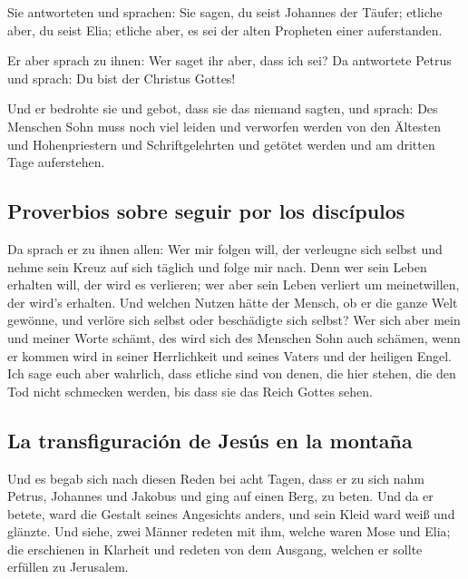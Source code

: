  Sie antworteten und sprachen: Sie sagen, du seist
Johannes der Täufer; etliche aber, du seist Elia; etliche aber, es sei
der alten Propheten einer auferstanden.

 Er aber sprach zu ihnen: Wer saget ihr aber, dass ich
sei? Da antwortete Petrus und sprach: Du bist der Christus Gottes!

 Und er bedrohte sie und gebot, dass sie das niemand
sagten,  und sprach: Des Menschen Sohn muss noch viel
leiden und verworfen werden von den Ältesten und Hohenpriestern und
Schriftgelehrten und getötet werden und am dritten Tage auferstehen.

\hypertarget{proverbios-sobre-seguir-por-los-discuxedpulos}{%
\subsection{Proverbios sobre seguir por los
discípulos}\label{proverbios-sobre-seguir-por-los-discuxedpulos}}

 Da sprach er zu ihnen allen: Wer mir folgen will, der
verleugne sich selbst und nehme sein Kreuz auf sich täglich und folge
mir nach.  Denn wer sein Leben erhalten will, der wird es
verlieren; wer aber sein Leben verliert um meinetwillen, der wird's
erhalten.  Und welchen Nutzen hätte der Mensch, ob er die
ganze Welt gewönne, und verlöre sich selbst oder beschädigte sich
selbst?  Wer sich aber mein und meiner Worte schämt, des
wird sich des Menschen Sohn auch schämen, wenn er kommen wird in seiner
Herrlichkeit und seines Vaters und der heiligen Engel. 
Ich sage euch aber wahrlich, dass etliche sind von denen, die hier
stehen, die den Tod nicht schmecken werden, bis dass sie das Reich
Gottes sehen.

\hypertarget{la-transfiguraciuxf3n-de-jesuxfas-en-la-montauxf1a}{%
\subsection{La transfiguración de Jesús en la
montaña}\label{la-transfiguraciuxf3n-de-jesuxfas-en-la-montauxf1a}}

 Und es begab sich nach diesen Reden bei acht Tagen, dass
er zu sich nahm Petrus, Johannes und Jakobus und ging auf einen Berg, zu
beten.  Und da er betete, ward die Gestalt seines
Angesichts anders, und sein Kleid ward weiß und glänzte. 
Und siehe, zwei Männer redeten mit ihm, welche waren Mose und Elia;
 die erschienen in Klarheit und redeten von dem Ausgang,
welchen er sollte erfüllen zu Jerusalem.

